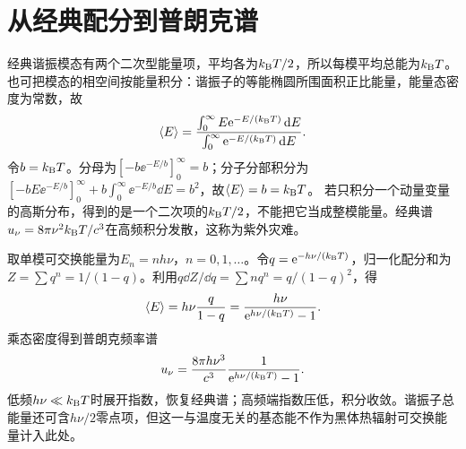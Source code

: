 
\section{从经典配分到普朗克谱}\label{th:m4planck}
经典谐振模态有两个二次型能量项，平均各为$k_{\mathrm B} T/2$，所以每模平均总能为$k_{\mathrm B} T$。也可把模态的相空间按能量积分：谐振子的等能椭圆所围面积正比能量，能量态密度为常数，故
\[
\langle E\rangle=\frac{\int_0^\infty E\mathrm e^{-E/(k_{\mathrm B} T)}\mathop{}\!\mathrm d E}{\int_0^\infty\mathrm e^{-E/(k_{\mathrm B} T)}\mathop{}\!\mathrm d E}.
\]
令$b=k_{\mathrm B} T$。分母为$[-b\ee^{-E/b}]_0^\infty=b$；分子分部积分为$[-bE\ee^{-E/b}]_0^\infty+b\int_0^\infty\ee^{-E/b}\dd E=b^2$，故$\langle E\rangle=b=k_{\mathrm B} T$。
若只积分一个动量变量的高斯分布，得到的是一个二次项的$k_{\mathrm B} T/2$，不能把它当成整模能量。经典谱$u_\nu=8\pi\nu^2k_{\mathrm B} T/c^3$在高频积分发散，这称为紫外灾难。

取单模可交换能量为$E_n=nh\nu$，$n=0,1,\ldots$。令$q=\mathrm e^{-h\nu/(k_{\mathrm B} T)}$，归一化配分和为$Z=\sum q^n=1/(1-q)$。利用$q\dd Z/\dd q=\sum nq^n=q/(1-q)^2$，得
\[
 \langle E\rangle=h\nu\frac q{1-q}=\frac{h\nu}{\mathrm e^{h\nu/(k_{\mathrm B} T)}-1}.
\]
乘态密度得到普朗克频率谱
\begin{equation}\label{eq:m4planck}
 u_\nu=\frac{8\pi h\nu^3}{c^3}\frac1{\mathrm e^{h\nu/(k_{\mathrm B} T)}-1}.
\end{equation}
低频$h\nu\ll k_{\mathrm B} T$时展开指数，恢复经典谱；高频端指数压低，积分收敛。谐振子总能量还可含$h\nu/2$零点项，但这一与温度无关的基态能不作为黑体热辐射可交换能量计入此处。

